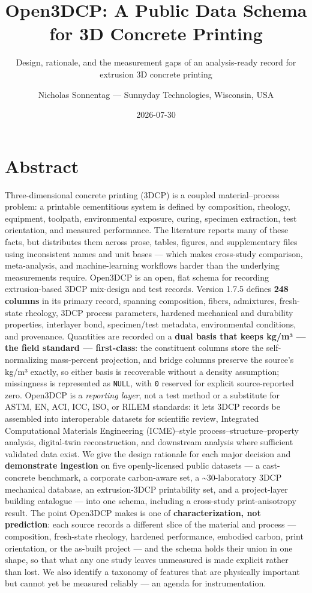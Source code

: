 \documentclass[
  11pt,
  letterpaper,
]{article}
\title{Open3DCP: A Public Data Schema for 3D Concrete Printing}
\subtitle{Design, rationale, and the measurement gaps of an
analysis-ready record for extrusion 3D concrete printing}
\author{Nicholas Sonnentag --- Sunnyday Technologies, Wisconsin, USA}
\date{2026-07-30}
\begin{document}
\maketitle

{
\setcounter{tocdepth}{2}
\tableofcontents
}
\section{Abstract}\label{abstract}

Three-dimensional concrete printing (3DCP) is a coupled
material--process problem: a printable cementitious system is defined by
composition, rheology, equipment, toolpath, environmental exposure,
curing, specimen extraction, test orientation, and measured performance.
The literature reports many of these facts, but distributes them across
prose, tables, figures, and supplementary files using inconsistent names
and unit bases --- which makes cross-study comparison, meta-analysis,
and machine-learning workflows harder than the underlying measurements
require. Open3DCP is an open, flat schema for recording extrusion-based
3DCP mix-design and test records. Version 1.7.5 defines \textbf{248
columns} in its primary record, spanning composition, fibers,
admixtures, fresh-state rheology, 3DCP process parameters, hardened
mechanical and durability properties, interlayer bond, specimen/test
metadata, environmental conditions, and provenance. Quantities are
recorded on a \textbf{dual basis that keeps kg/m³ --- the field standard
--- first-class}: the constituent columns store the self-normalizing
mass-percent projection, and bridge columns preserve the source's kg/m³
exactly, so either basis is recoverable without a density assumption;
missingness is represented as \texttt{NULL}, with \texttt{0} reserved
for explicit source-reported zero. Open3DCP is a \emph{reporting layer},
not a test method or a substitute for ASTM, EN, ACI, ICC, ISO, or RILEM
standards: it lets 3DCP records be assembled into interoperable datasets
for scientific review, Integrated Computational Materials Engineering
(ICME)--style process--structure--property analysis, digital-twin
reconstruction, and downstream analysis where sufficient validated data
exist. We give the design rationale for each major decision and
\textbf{demonstrate ingestion} on five openly-licensed public datasets
--- a cast-concrete benchmark, a corporate carbon-aware set, a
\textasciitilde30-laboratory 3DCP mechanical database, an extrusion-3DCP
printability set, and a project-layer building catalogue --- into one
schema, including a cross-study print-anisotropy result. The point
Open3DCP makes is one of \textbf{characterization, not prediction}: each
source records a different slice of the material and process ---
composition, fresh-state rheology, hardened performance, embodied
carbon, print orientation, or the as-built project --- and the schema
holds their union in one shape, so that what any one study leaves
unmeasured is made explicit rather than lost. We also identify a
taxonomy of features that are physically important but cannot yet be
measured reliably --- an agenda for instrumentation.
\end{document}
